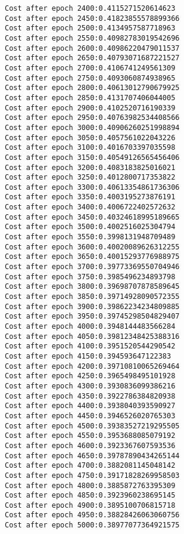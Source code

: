 \documentclass[11pt]{article}
\begin{document}
\begin{Verbatim}[commandchars=\\\{\}]
Cost after epoch 2400:0.4115271520614623
Cost after epoch 2450:0.41823855578899366
Cost after epoch 2500:0.4134957587718963
Cost after epoch 2550:0.40982783019542696
Cost after epoch 2600:0.40986220479011537
Cost after epoch 2650:0.40793071687221527
Cost after epoch 2700:0.4106741249561309
Cost after epoch 2750:0.4093060874938965
Cost after epoch 2800:0.40613012790679925
Cost after epoch 2850:0.4131707406044005
Cost after epoch 2900:0.4102520716190339
Cost after epoch 2950:0.40763982534408566
Cost after epoch 3000:0.40906260251998894
Cost after epoch 3050:0.4057561022043226
Cost after epoch 3100:0.4016703397035598
Cost after epoch 3150:0.40549126565456406
Cost after epoch 3200:0.4083183825016021
Cost after epoch 3250:0.4012800717353822
Cost after epoch 3300:0.40613354861736306
Cost after epoch 3350:0.4003195273876191
Cost after epoch 3400:0.4006722402572632
Cost after epoch 3450:0.40324618995189665
Cost after epoch 3500:0.4002516025304794
Cost after epoch 3550:0.3998131948709489
Cost after epoch 3600:0.40020089626312255
Cost after epoch 3650:0.40015293776988975
Cost after epoch 3700:0.39773369550704946
Cost after epoch 3750:0.3985496234893798
Cost after epoch 3800:0.39698707878589645
Cost after epoch 3850:0.39714928090572355
Cost after epoch 3900:0.39862234234809885
Cost after epoch 3950:0.39745298504829407
Cost after epoch 4000:0.3948144483566284
Cost after epoch 4050:0.39812348425388316
Cost after epoch 4100:0.3951520544290542
Cost after epoch 4150:0.394593647122383
Cost after epoch 4200:0.39710810065269464
Cost after epoch 4250:0.3965498495101928
Cost after epoch 4300:0.3930836099386216
Cost after epoch 4350:0.3922786384820938
Cost after epoch 4400:0.3938040393590927
Cost after epoch 4450:0.3946526020765303
Cost after epoch 4500:0.39383527219295505
Cost after epoch 4550:0.3953688085079192
Cost after epoch 4600:0.3923367607593536
Cost after epoch 4650:0.39787890434265144
Cost after epoch 4700:0.3882081145048142
Cost after epoch 4750:0.39171828269958503
Cost after epoch 4800:0.3885872763395309
Cost after epoch 4850:0.3923960238695145
Cost after epoch 4900:0.3895100706815718
Cost after epoch 4950:0.38828426063060756
Cost after epoch 5000:0.38977077364921575

    \end{Verbatim}

    \begin{center}
    \end{center}
    { \hspace*{\fill} \\}
    
\end{document}
